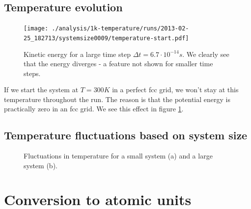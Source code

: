 \documentclass[reprint,floatfix,amsmath,amssymb,aps,pra]{revtex4-1}
\begin{document}
\subsection{Temperature evolution}

\begin{figure}
  \centering
  \texttt{[image: ./analysis/1k-temperature/runs/2013-02-25\_182713/systemsize0009/temperature-start.pdf]}
  \caption{Kinetic energy for a large time step $\Delta t = 6.7 \cdot 10^{-14} \unit{s}$. We clearly see that the energy diverges - a feature not shown for smaller time steps.}
  \label{fig:temperature-evolution}
\end{figure}

If we start the system at $T = 300 \unit{K}$ in a perfect fcc grid, we won't stay at this temperature throughout the run. The reason is that the potential energy is practically zero in an fcc grid. We see this effect in figure \ref{fig:temperature-evolution}.

\subsection{Temperature fluctuations based on system size}

\begin{figure}
    \centering
     \label{fig:temperature-fluctuations-small}
     \label{fig:temperature-fluctuations-large}
    \caption{Fluctuations in temperature for a small system (a) and a large system (b).}
    \label{fig:temperature-fluctuations}
\end{figure}






\appendix

\section{Conversion to atomic units}



\end{document}
